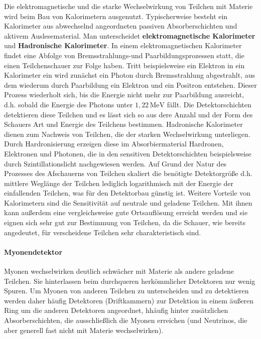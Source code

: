 Die elektromagnetische und die starke Wechselwirkung von Teilchen mit Materie wird beim Bau von Kalorimetern ausgenutzt. Typischerweise besteht ein Kalorimeter aus abwechselnd angeordneten passiven Absorberschichten und aktivem Auslesematerial. Man unterscheidet \textbf{elektromagnetische Kalorimeter} und \textbf{Hadronische Kalorimeter}. 
In einem elektromagnetischen Kalorimeter findet eine Abfolge von Bremsstrahlungs-und Paarbildungsprozessen statt, die einen Teilchenschauer zur Folge haben. Tritt beispielsweise ein Elektron in ein Kalorimeter ein wird zunächst ein Photon durch Bremsstrahlung abgestrahlt, aus dem wiederum durch Paarbildung ein Elektron und ein Positron entstehen. Dieser Prozess wiederholt sich, bis die Energie nicht mehr zur Paarbildung ausreicht, d.h. sobald die Energie des Photons unter $1,22\,\mathrm{MeV}$ fällt. Die Detektorschichten detektieren diese Teilchen und es lässt sich so aus dere Anzahl und der Form des Schauers Art und Energie des Teilchens bestimmen. 
Hadronische Kalorimeter dienen zum Nachweis von Teilchen, die der starken Wechselwirkung unterliegen. Durch Hardronisierung erzeigen diese im Absorbiermaterial Hardronen, Elektronen und Photonen, die in den sensitiven Detektorschichten beispielsweise durch Szintillationslicht nachgewiesen werden. 
Auf Grund der Natur des Prozesses des Afschauerns von Teilchen skaliert die benötigte Detektorgröße d.h. mittlere Weglänge der Teilchen lediglich logarithmisch mit der Energie der einfallenden Teilchen, was für den Detektorbau günstig ist. Weitere Vorteile von Kalorimetern sind die Sensitivität auf neutrale und geladene Teilchen. Mit ihnen kann außerdem eine vergleichsweise gute Ortsauflösung erreicht werden und sie eignen sich sehr gut zur Bestimmung von Teilchen, da die Schauer, wie bereits angedeutet, für verscheidene Teilchen sehr charakteristisch sind.

\paragraph{Myonendetektor}

Myonen wechselwirken deutlich schwächer mit Materie als andere geladene Teilchen. Sie hinterlassen beim durchqueren herkömmlicher Detektoren nur wenig Spuren. Um Myonen von anderen Teilchen zu unterscheiden und zu detektieren werden daher häufig Detektoren (Driftkammern) zur Detektion in einem äußeren Ring um die anderen Detektoren angeordnet, hhäufig hinter zusätzlichen Absorberschichten, die ausschließlich die Myonen erreichen (und Neutrinos, die aber generell fast nicht mit Materie wechselwirken). 

